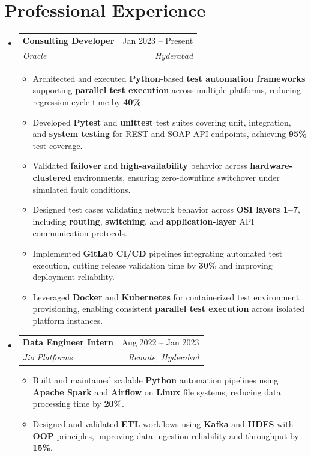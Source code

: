 \documentclass[letterpaper,11pt]{article}
\makeatletter
\newcommand{\resumeItem}[1]{
  \item\small{
    {#1 \vspace{-2pt}}
  }
}
\newcommand{\resumeSubheading}[4]{
  \vspace{-2pt}\item
    \begin{tabular*}{0.97\textwidth}[t]{l@{\extracolsep{\fill}}r}
      \textbf{#1} & #2 \\
      \textit{\small#3} & \textit{\small #4} \\
    \end{tabular*}\vspace{-7pt}
}
\newcommand{\resumeSubHeadingListStart}{\begin{itemize}[leftmargin=0.15in, label={}]}
\newcommand{\resumeSubHeadingListEnd}{\end{itemize}}
\newcommand{\resumeItemListStart}{\begin{itemize}}
\newcommand{\resumeItemListEnd}{\end{itemize}\vspace{-5pt}}
\makeatother
\begin{document}
\section{Professional Experience}
\resumeSubHeadingListStart
    \resumeSubheading
      {Consulting Developer}{Jan 2023 -- Present}
      {Oracle}{Hyderabad}
      \resumeItemListStart
        \resumeItem{Architected and executed \textbf{Python}-based \textbf{test automation frameworks} supporting \textbf{parallel test execution} across multiple platforms, reducing regression cycle time by \textbf{40\%}.}
        \resumeItem{Developed \textbf{Pytest} and \textbf{unittest} test suites covering unit, integration, and \textbf{system testing} for REST and SOAP API endpoints, achieving \textbf{95\%} test coverage.}
        \resumeItem{Validated \textbf{failover} and \textbf{high-availability} behavior across \textbf{hardware-clustered} environments, ensuring zero-downtime switchover under simulated fault conditions.}
        \resumeItem{Designed test cases validating network behavior across \textbf{OSI layers 1--7}, including \textbf{routing}, \textbf{switching}, and \textbf{application-layer} API communication protocols.}
        \resumeItem{Implemented \textbf{GitLab CI/CD} pipelines integrating automated test execution, cutting release validation time by \textbf{30\%} and improving deployment reliability.}
        \resumeItem{Leveraged \textbf{Docker} and \textbf{Kubernetes} for containerized test environment provisioning, enabling consistent \textbf{parallel test execution} across isolated platform instances.}
      \resumeItemListEnd
    \resumeSubheading
      {Data Engineer Intern}{Aug 2022 -- Jan 2023}
      {Jio Platforms}{Remote, Hyderabad}
      \resumeItemListStart
        \resumeItem{Built and maintained scalable \textbf{Python} automation pipelines using \textbf{Apache Spark} and \textbf{Airflow} on \textbf{Linux} file systems, reducing data processing time by \textbf{20\%}.}
        \resumeItem{Designed and validated \textbf{ETL} workflows using \textbf{Kafka} and \textbf{HDFS} with \textbf{OOP} principles, improving data ingestion reliability and throughput by \textbf{15\%}.}
      \resumeItemListEnd
\resumeSubHeadingListEnd
\end{document}
